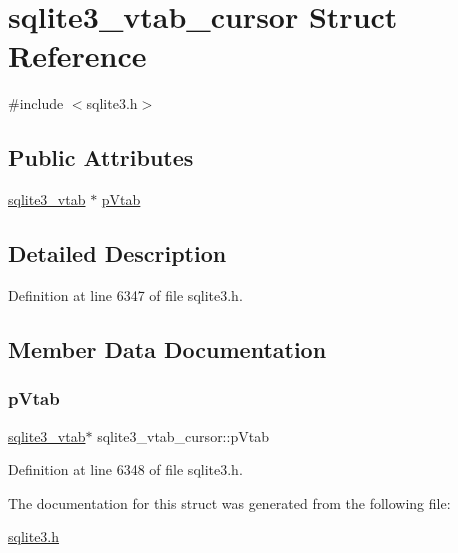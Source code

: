 \hypertarget{structsqlite3__vtab__cursor}{}\section{sqlite3\+\_\+vtab\+\_\+cursor Struct Reference}
\label{structsqlite3__vtab__cursor}


{\ttfamily \#include $<$sqlite3.\+h$>$}

\subsection*{Public Attributes}
\begin{DoxyCompactItemize}
\item 
\mbox{\hyperlink{structsqlite3__vtab}{sqlite3\+\_\+vtab}} $\ast$ \mbox{\hyperlink{structsqlite3__vtab__cursor_a2989d9f84a35506c3ef9fe9e9ecd3365}{p\+Vtab}}
\end{DoxyCompactItemize}


\subsection{Detailed Description}


Definition at line 6347 of file sqlite3.\+h.



\subsection{Member Data Documentation}
\mbox{\label{structsqlite3__vtab__cursor_a2989d9f84a35506c3ef9fe9e9ecd3365}} 
\subsubsection{\texorpdfstring{p\+Vtab}{pVtab}}
{\footnotesize\ttfamily \mbox{\hyperlink{structsqlite3__vtab}{sqlite3\+\_\+vtab}}$\ast$ sqlite3\+\_\+vtab\+\_\+cursor\+::p\+Vtab}



Definition at line 6348 of file sqlite3.\+h.



The documentation for this struct was generated from the following file\+:\begin{DoxyCompactItemize}
\item 
\mbox{\hyperlink{sqlite3_8h}{sqlite3.\+h}}\end{DoxyCompactItemize}
